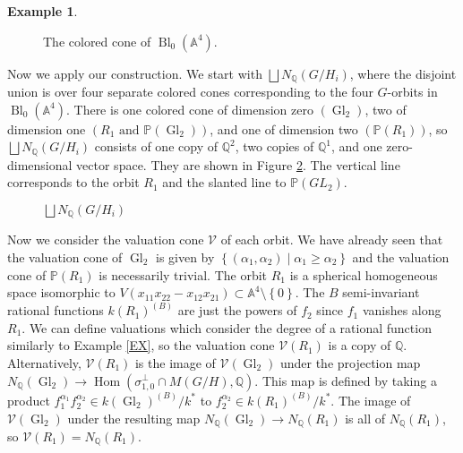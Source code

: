 \documentclass[12pt,twoside,cd]{amsart}
\theoremstyle{definition}
\newtheorem{example}[theorem]{Example}
\begin{document}
\begin{example}
\begin{figure}[!h]
\begin{floatrow}
{
\caption{The colored cone of ${\operatorname{Bl}}_0(\mathbb{A}^4)$.}
\label{blowupA4}}

\end{floatrow}
\end{figure}

Now we apply our construction. 
We start with $\bigsqcup N_\mathbb{Q}(G/H_i)$, where the disjoint union is over four separate colored cones corresponding to the four $G$-orbits in ${\operatorname{Bl}}_0(\mathbb{A}^4)$.
There is one colored cone of dimension zero $({\operatorname{Gl}}_2)$, two of dimension one $(R_1 \text{ and } \mathbb{P}({\operatorname{Gl}}_2))$, and one of dimension two $(\mathbb{P}(R_1))$, so $\bigsqcup N_\mathbb{Q}(G/H_i)$ consists of one copy of $\mathbb{Q}^2$, two copies of $\mathbb{Q}^1$, and one zero-dimensional vector space.
They are shown in Figure \ref{QA4}. The vertical line corresponds to the orbit $R_1$ and the slanted line to $\mathbb{P}(GL_2)$.
\begin{figure}[!h]
\caption{$\bigsqcup N_\mathbb{Q}(G/H_i)$}
\label{QA4}
\end{figure}

Now we consider the valuation cone $\mathcal{V}$ of each orbit.
We have already seen that the valuation cone of ${\operatorname{Gl}}_2$ is given by ${\left\lbrace {(\alpha_1,\alpha_2) \mid \alpha_1 \geq \alpha_2} \right\rbrace}$ and the valuation cone of $\mathbb{P}(R_1)$ is necessarily trivial.
The orbit $R_1$ is a spherical homogeneous space isomorphic to $V(x_{11}x_{22} - x_{12}x_{21}) \subset \mathbb{A}^4 \setminus {\left\lbrace {0} \right\rbrace}$.
The $B$ semi-invariant rational functions $k(R_1)^{(B)}$ are just the powers of $f_2$ since $f_1$ vanishes along $R_1$.
We can define valuations which consider the degree of a rational function similarly to Example \ref{EX}, so the valuation cone $\mathcal{V}(R_1)$ is a copy of $\mathbb{Q}$.
Alternatively, $\mathcal{V}(R_1)$ is the image of $\mathcal{V}({\operatorname{Gl}}_2)$ under the projection map $N_\mathbb{Q}({\operatorname{Gl}}_2) \rightarrow {\operatorname{Hom}}{(\sigma_{1,0}^\perp \cap M(G/H),\mathbb{Q})}$.
This map is defined by taking a product $f_1^{\alpha_1}f_2^{\alpha_2} \in k({\operatorname{Gl}}_2)^{(B)}/k^*$ to $f_2^{\alpha_2} \in k(R_1)^{(B)}/k^*$.
The image of $\mathcal{V}({\operatorname{Gl}}_2)$ under the resulting map $N_\mathbb{Q}({\operatorname{Gl}}_2) \rightarrow N_\mathbb{Q}(R_1)$ is all of $N_\mathbb{Q}(R_1)$, so $\mathcal{V}(R_1) = N_\mathbb{Q}(R_1)$.


\end{example}
\end{document}
